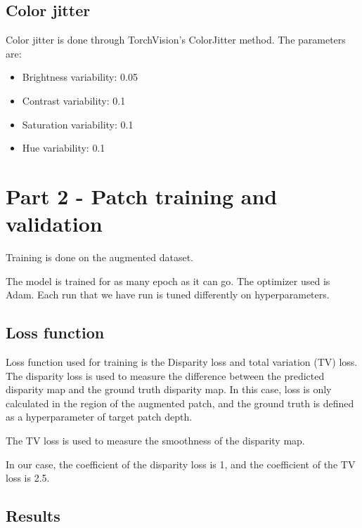\documentclass[conference]{IEEEtran}
\begin{document}
\subsection{Color jitter}
Color jitter is done through TorchVision's ColorJitter method. The parameters are:
\begin{itemize}
  \item Brightness variability: 0.05
  \item Contrast variability: 0.1
  \item Saturation variability: 0.1
  \item Hue variability: 0.1
\end{itemize}

\section{Part 2 - Patch training and validation}
Training is done on the augmented dataset. 

The model is trained for as many epoch as it can go. The optimizer used is Adam. Each run that we have run is tuned differently on hyperparameters.

\subsection{Loss function}
Loss function used for training is the Disparity loss and total variation (TV) loss. The disparity loss is used to measure the difference between the predicted disparity map and the ground truth disparity map. In this case, loss is only calculated in the region of the augmented patch, and the ground truth is defined as a hyperparameter of target patch depth.

The TV loss is used to measure the smoothness of the disparity map.

In our case, the coefficient of the disparity loss is 1, and the coefficient of the TV loss is 2.5.

\subsection{Results}
\end{document}
